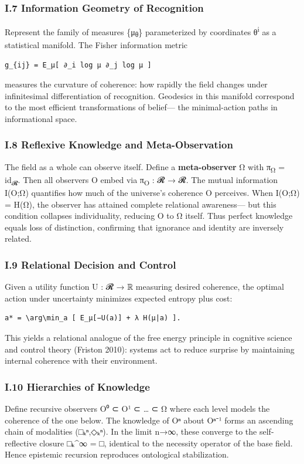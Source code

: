 \documentclass[11pt]{article}
\begin{document}
\subsubsection*{I.7 Information Geometry of Recognition}
\label{sec:org774e92d}
Represent the family of measures \{μ\textsubscript{θ}\} parameterized by coordinates θ\textsuperscript{i}  
as a statistical manifold.  
The Fisher information metric  

\begin{verbatim}
g_{ij} = E_μ[ ∂_i log μ ∂_j log μ ]
\end{verbatim}

measures the curvature of coherence:  
how rapidly the field changes under infinitesimal differentiation of recognition.  
Geodesics in this manifold correspond to the most efficient transformations of belief—  
the minimal-action paths in informational space.
\subsubsection*{I.8 Reflexive Knowledge and Meta-Observation}
\label{sec:org87fda65}
The field as a whole can observe itself.  
Define a \textbf{meta-observer} Ω with π\textsubscript{Ω} = id\textsubscript{𝓡}.  
Then all observers O embed via π\textsubscript{O} : 𝓡 → 𝓡.  
The mutual information I(O;Ω) quantifies  
how much of the universe’s coherence O perceives.  
When I(O;Ω) = H(Ω), the observer has attained complete relational awareness—  
but this condition collapses individuality,  
reducing O to Ω itself.  
Thus perfect knowledge equals loss of distinction,  
confirming that ignorance and identity are inversely related.
\subsubsection*{I.9 Relational Decision and Control}
\label{sec:org779de61}
Given a utility function U : 𝓡 → ℝ measuring desired coherence,  
the optimal action under uncertainty minimizes expected entropy plus cost:

\begin{verbatim}
a* = \arg\min_a [ E_μ[−U(a)] + λ H(μ|a) ].
\end{verbatim}

This yields a relational analogue of the free energy principle  
in cognitive science and control theory (Friston 2010):  
systems act to reduce surprise by maintaining internal coherence with their environment.
\subsubsection*{I.10 Hierarchies of Knowledge}
\label{sec:org7627ced}
Define recursive observers O⁰ ⊂ O¹ ⊂ … ⊂ Ω  
where each level models the coherence of the one below.  
The knowledge of Oⁿ about Oⁿ⁻¹ forms an ascending chain of modalities  
(□ₖⁿ,◇ₖⁿ).  
In the limit n→∞,  
these converge to the self-reflective closure □ₖ\^{}∞ = □,  
identical to the necessity operator of the base field.  
Hence epistemic recursion reproduces ontological stabilization.
\end{document}
